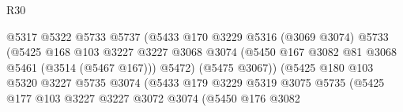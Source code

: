 \begin{lexlean}{R30}
\begin{coremodule}
                                            @5317
                                            @5322
                                            @5733
                                            @5737
                                            (@5433
                                              @170
                                              @3229
                                              @5316
                                              (@3069 @3074)
                                              @5733
                                              (@5425
                                                @168
                                                @103
                                                @3227
                                                @3227
                                                @3068
                                                @3074
                                                (@5450
                                                  @167
                                                  @3082
                                                  @81
                                                  @3068
                                                  @5461
                                                  (@3514 (@5467 @167)))
                                                @5472)
                                              (@5475 @3067))
                                            (@5425
                                              @180
                                              @103
                                              @5320
                                              @3227
                                              @5735
                                              @3074
                                              (@5433
                                                @179
                                                @3229
                                                @5319
                                                @3075
                                                @5735
                                                (@5425
                                                  @177
                                                  @103
                                                  @3227
                                                  @3227
                                                  @3072
                                                  @3074
                                                  (@5450
                                                    @176
                                                    @3082

\end{coremodule}
\end{lexlean}

